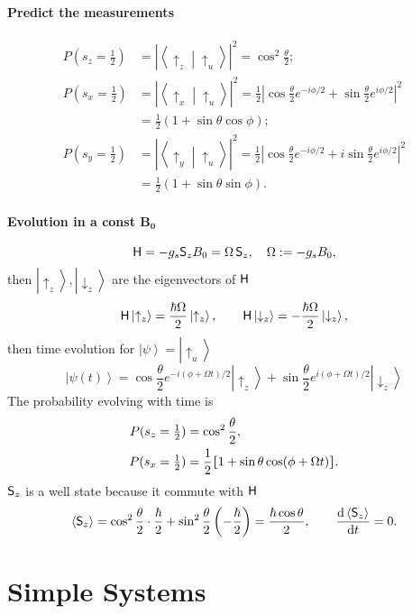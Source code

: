 \documentclass{article}
\def\d{{\rm d}}
\def\u{\uparrow}\def\v{\downarrow}
\newcommand{\ko}[1]{\hspace{-#1 pt}}%
\newcommand{\ds}[2]{\frac{\d #1}{\d #2}}%
\newcommand{\ave}[1]{\left\langle #1\right\rangle}%
\newcommand{\ket}[1]{\left\vert #1\right\rangle}
\newcommand{\brkt}[2]{\left\langle #1\middle\vert#2\right\rangle}
\newcommand{\kh}[1]{\left(#1\right)}
\newcommand{\cmm}[1]{\lfloor\ko{4.45}\lceil #1\rceil\ko{4.45}\rfloor}%
\begin{document}
\paragraph{Predict the measurements}
\begin{align*}
	P(s_z=\textstyle\frac12) & =\left\vert\brkt{\u_z}{\u_u}\right\vert^2=\cos^2\frac\theta{2};                                                                       \\
	P(s_x=\textstyle\frac12) & =\left\vert\brkt{\u_x}{\u_u}\right\vert^2=\frac12\left\vert\cos\frac{\theta}2e^{-i\phi/2}+\sin\frac{\theta}2e^{i\phi/2}\right\vert^2  \\
	                         & =\frac12\kh{1+\sin\theta\cos\phi};                                                                                                    \\
	P(s_y=\textstyle\frac12) & =\left\vert\brkt{\u_y}{\u_u}\right\vert^2=\frac12\left\vert\cos\frac{\theta}2e^{-i\phi/2}+i\sin\frac{\theta}2e^{i\phi/2}\right\vert^2 \\
	                         & =\frac12\kh{1+\sin\theta\sin\phi}.
\end{align*}
\paragraph{Evolution in a const $\bm{B_0}$}
$$\mathsf H=-g_s\mathsf S_zB_0=\Omega\,\mathsf S_z,\quad\Omega:=-g_sB_0,$$
then $\ket{\u_z},\ket{\v_z}$ are the eigenvectors of $\mathsf H$
$$\sH\ket{\u_z}=\frac{\hbar\Omega}2\ket{\u_z},\qquad\sH\ket{\v_z}=-\frac{\hbar\Omega}2\ket{\v_z},$$
then time evolution for $\ket\psi=\ket{\u_u}$
$$\ket{\psi(t)}=\cos\frac{\theta}2e^{-i(\phi+\Omega t)/2}\ket{\u_z}+\sin\frac{\theta}2e^{i(\phi+\Omega t)/2}\ket{\v_z}$$
The probability evolving with time is
\begin{align*}
	P(s_z=\textstyle\frac12) & =\cos^2\frac\theta{2},                         \\
	P(s_x=\textstyle\frac12) & =\frac12\cmm{1+\sin\theta\cos(\phi+\Omega t)}.
\end{align*}
$\mathsf S_z$ is a well state because it commute with $\mathsf H$
$$\ave{\sS_z}=\cos^2\frac\theta{2}\cdot\frac\hbar{2}+\sin^2\frac\theta{2}\left(-\frac\hbar{2}\right)=\frac{\hbar\cos\theta}2,\qquad\ds{\ave{\sS_z}}t=0.$$
\clearpage
\section{Simple Systems}
\end{document}
